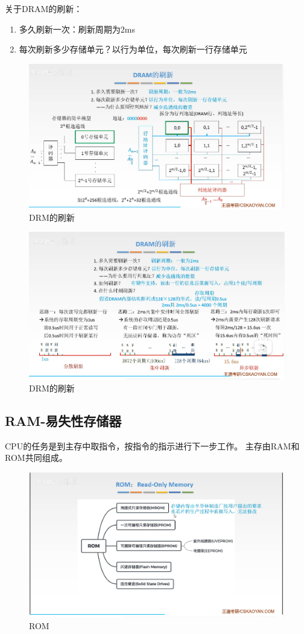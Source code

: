 \documentclass[12pt]{ctexart}
\begin{document}
关于DRAM的刷新：
\begin{enumerate}
    \item 多久刷新一次：刷新周期为2ms
    \item 每次刷新多少存储单元？以行为单位，每次刷新一行存储单元
\end{enumerate}
\begin{figure}[htbp]
    \centering
    \includegraphics[scale=0.6]{DRM的刷新.png}
    \caption{DRM的刷新}
    \end{figure}
\begin{figure}[htbp]
    \centering
    \includegraphics[scale=0.6]{DRM的刷新1.png}
    \caption{DRM的刷新}
     \end{figure}
\subsection{RAM-易失性存储器}
CPU的任务是到主存中取指令，按指令的指示进行下一步工作。
主存由RAM和ROM共同组成。
\begin{figure}[htbp]
    \centering
    \includegraphics[scale=0.6]{ROM.png}
    \caption{ROM}
     \end{figure}
\end{document}
